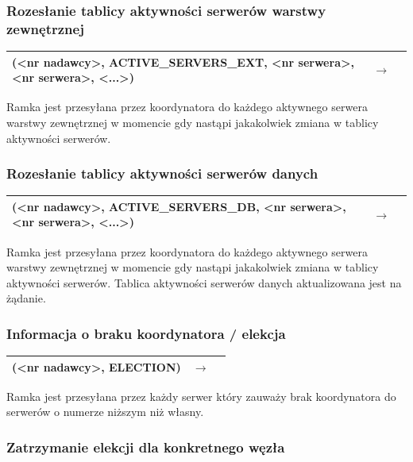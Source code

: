 \subsubsection{Rozesłanie tablicy aktywności serwerów warstwy zewnętrznej}

\begin{longtable}{| p{} | p{}| p{} |} 
\hline
(<nr nadawcy>, ACTIVE\_SERVERS\_EXT, <nr serwera>, <nr serwera>, <...>) & $\rightarrow$ &  \\ \hline
\end{longtable}

Ramka jest przesyłana przez koordynatora do każdego aktywnego serwera warstwy zewnętrznej w momencie gdy nastąpi jakakolwiek zmiana w tablicy aktywności serwerów.

\subsubsection{Rozesłanie tablicy aktywności serwerów danych}

\begin{longtable}{| p{} | p{}| p{} |} 
\hline
(<nr nadawcy>, ACTIVE\_SERVERS\_DB, <nr serwera>, <nr serwera>, <...>) & $\rightarrow$ &  \\ \hline
\end{longtable}

Ramka jest przesyłana przez koordynatora do każdego aktywnego serwera warstwy zewnętrznej w momencie gdy nastąpi jakakolwiek zmiana w tablicy aktywności serwerów. Tablica aktywności serwerów danych aktualizowana jest na żądanie.

\subsubsection{Informacja o braku koordynatora / elekcja}

\begin{longtable}{| p{} | p{}| p{} |} 
\hline
(<nr nadawcy>, ELECTION) & $\rightarrow$ &  \\ \hline
\end{longtable}

Ramka jest przesyłana przez każdy serwer który zauważy brak koordynatora do serwerów o numerze niższym niż własny.

\subsubsection{Zatrzymanie elekcji dla konkretnego węzła}

